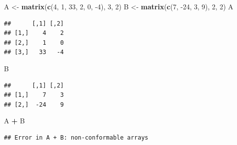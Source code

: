 \documentclass[
]{book}
\newenvironment{Shaded}{\begin{snugshade}}{\end{snugshade}}
\newcommand{\DecValTok}[1]{\textcolor[rgb]{0.00,0.00,0.81}{#1}}
\newcommand{\KeywordTok}[1]{\textcolor[rgb]{0.13,0.29,0.53}{\textbf{#1}}}
\newcommand{\NormalTok}[1]{#1}
\newcommand{\OperatorTok}[1]{\textcolor[rgb]{0.81,0.36,0.00}{\textbf{#1}}}
\newcommand{\StringTok}[1]{\textcolor[rgb]{0.31,0.60,0.02}{#1}}
\theoremstyle{definition}
\theoremstyle{definition}
\theoremstyle{definition}
\theoremstyle{definition}
\theoremstyle{remark}
\begin{document}
\begin{Shaded}
\begin{Highlighting}[]
\NormalTok{A <-}\StringTok{ }\KeywordTok{matrix}\NormalTok{(}\KeywordTok{c}\NormalTok{(}\DecValTok{4}\NormalTok{, }\DecValTok{1}\NormalTok{, }\DecValTok{33}\NormalTok{, }\DecValTok{2}\NormalTok{, }\DecValTok{0}\NormalTok{, }\DecValTok{-4}\NormalTok{), }\DecValTok{3}\NormalTok{, }\DecValTok{2}\NormalTok{)}
\NormalTok{B <-}\StringTok{ }\KeywordTok{matrix}\NormalTok{(}\KeywordTok{c}\NormalTok{(}\DecValTok{7}\NormalTok{, }\DecValTok{-24}\NormalTok{, }\DecValTok{3}\NormalTok{, }\DecValTok{9}\NormalTok{), }\DecValTok{2}\NormalTok{, }\DecValTok{2}\NormalTok{)}
\NormalTok{A}
\end{Highlighting}
\end{Shaded}

\begin{verbatim}
##      [,1] [,2]
## [1,]    4    2
## [2,]    1    0
## [3,]   33   -4
\end{verbatim}

\begin{Shaded}
\begin{Highlighting}[]
\NormalTok{B}
\end{Highlighting}
\end{Shaded}

\begin{verbatim}
##      [,1] [,2]
## [1,]    7    3
## [2,]  -24    9
\end{verbatim}

\begin{Shaded}
\begin{Highlighting}[]
\NormalTok{A }\OperatorTok{+}\StringTok{ }\NormalTok{B}
\end{Highlighting}
\end{Shaded}

\begin{verbatim}
## Error in A + B: non-conformable arrays
\end{verbatim}
\end{document}
